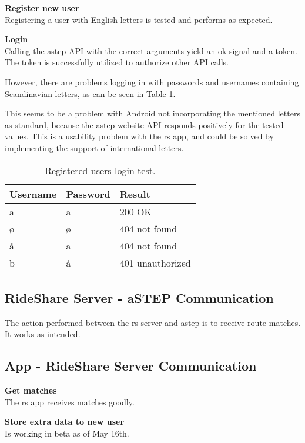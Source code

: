 \textbf{Register new user}\\
Registering a user with English letters is tested and performs as expected.

\textbf{Login}\\
Calling the \gls{astep} API with the correct arguments yield an ok signal and a token.
The token is successfully utilized to authorize other API calls.

However, there are problems logging in with passwords and usernames containing Scandinavian letters, as can be seen in Table \ref{tab:logintest}.

This seems to be a problem with Android not incorporating the mentioned letters as standard, because the \gls{astep} website API responds positively for the tested values.
This is a usability problem with the \gls{rs} app, and could be solved by implementing the support of international letters.

\begin{table}[!ht]
	\centering
	\begin{tabular}{@{}lll@{}}
		Username & Password & Result \\
		\hline
		a & a & 200 OK\\
		ø & ø & 404 not found\\
		å & a & 404 not found\\
		b & å & 401 unauthorized\\
	\end{tabular}
	\caption{Registered users login test.}
	\label{tab:logintest}
\end{table}


\subsection{RideShare Server - aSTEP Communication}
The action performed between the \gls{rs} server and \gls{astep} is to receive route matches.
It works as intended.


\subsection{App - RideShare Server Communication}
\textbf{Get matches}\\
The \gls{rs} app receives matches goodly.

\textbf{Store extra data to new user}\\
Is working in beta as of May 16th.